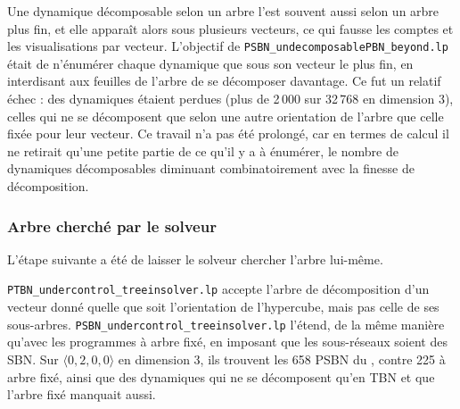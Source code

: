 \documentclass[12pt, a4paper]{article}
\begin{document}
Une dynamique décomposable selon un arbre l'est souvent aussi selon un arbre plus fin, et elle apparaît alors sous plusieurs vecteurs, ce qui fausse les comptes et les visualisations par vecteur.
L'objectif de \texttt{PSBN\_undecomposablePBN\_beyond.lp} était de n'énumérer chaque dynamique que sous son vecteur le plus fin, en interdisant aux feuilles de l'arbre de se décomposer davantage.
Ce fut un relatif échec : des dynamiques étaient perdues (plus de 2\,000 sur 32\,768 en dimension 3), celles qui ne se décomposent que selon une autre orientation de l'arbre que celle fixée pour leur vecteur.
Ce travail n'a pas été prolongé, car en termes de calcul il ne retirait qu'une petite partie de ce qu'il y a à énumérer, le nombre de dynamiques décomposables diminuant combinatoirement avec la finesse de décomposition.


\subsubsection{Arbre cherché par le solveur}

L'étape suivante a été de laisser le solveur chercher l'arbre lui-même.

\texttt{PTBN\_undercontrol\_treeinsolver.lp} accepte l'arbre de décomposition d'un vecteur donné quelle que soit l'orientation de l'hypercube, mais pas celle de ses sous-arbres.
\texttt{PSBN\_undercontrol\_treeinsolver.lp} l'étend, de la même manière qu'avec les programmes à arbre fixé, en imposant que les sous-réseaux soient des SBN.
Sur $\langle 0,2,0,0\rangle$ en dimension 3, ils trouvent les 658 PSBN du , contre 225 à arbre fixé, ainsi que des dynamiques qui ne se décomposent qu'en TBN et que l'arbre fixé manquait aussi.
\end{document}
